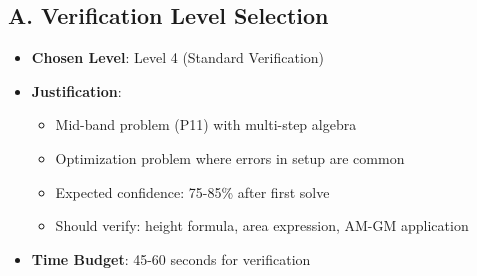 \documentclass[12pt]{article}
\begin{document}
\begin{verificationbox}
\subsection*{A. Verification Level Selection}
\begin{itemize}[leftmargin=*]
    \item \textbf{Chosen Level}: Level 4 (Standard Verification)
    \item \textbf{Justification}: 
    \begin{itemize}
        \item Mid-band problem (P11) with multi-step algebra
        \item Optimization problem where errors in setup are common
        \item Expected confidence: 75-85\% after first solve
        \item Should verify: height formula, area expression, AM-GM application
    \end{itemize}
    \item \textbf{Time Budget}: 45-60 seconds for verification
\end{itemize}


\end{verificationbox}
\end{document}
